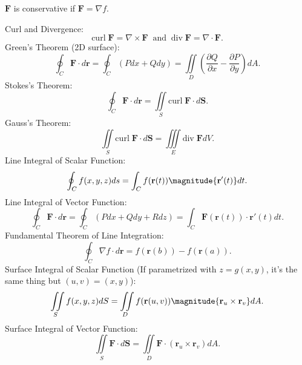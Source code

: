 \documentclass[11pt]{scrartcl}
\newcommand{\bvec}[1]{\mathbf{#1}}
\newcommand{\curl}{\mathrm{curl}\;}
\newcommand{\vdiv}{\mathrm{div}\;}
\begin{document}
    $\bvec{F}$ is conservative if $\bvec{F} = \nabla f$.

    Curl and Divergence:
    \[\curl\bvec{F} = \nabla \times \bvec{F} \;\; \text{and} \;\; \vdiv\bvec{F} = \nabla \cdot \bvec{F}.\]
    Green's Theorem (2D surface):
    \[\oint_{C}\bvec{F} \cdot d\bvec{r} = \oint_{C}(Pdx + Qdy) = \iint\limits_{D}\left(\frac{\partial Q}{\partial x} - \frac{\partial P}{\partial y}\right)dA.\]
    Stokes's Theorem:
    \[\oint_{C}\bvec{F} \cdot d\bvec{r} = \iint\limits_{S}\curl\bvec{F} \cdot d\bvec{S}.\]
    Gauss's Theorem:
    \[\iint\limits_{S}\curl\bvec{F} \cdot d\bvec{S} = \iiint\limits_{E}\vdiv\bvec{F}dV.\]
    Line Integral of Scalar Function:
    \[\oint_{C}f(x, y, z)ds = \int_{C}f(\bvec{r}(t))\magnitude{\bvec{r}'(t)}dt.\]
    Line Integral of Vector Function:
    \[\oint_{C}\bvec{F} \cdot d\bvec{r} = \oint_{C}(Pdx + Qdy + Rdz) = \int_{C}\bvec{F}(\bvec{r}(t)) \cdot \bvec{r}'(t)dt.\]
    Fundamental Theorem of Line Integration:
    \[\oint_{C}\nabla f \cdot d\bvec{r} = f(\bvec{r}(b)) - f(\bvec{r}(a)).\]
    Surface Integral of Scalar Function (If parametrized with $z = g(x, y)$, it's the same thing but $(u, v) = (x, y)$):
    \[\iint\limits_{S}f(x, y, z)dS = \iint\limits_{D}f(\bvec{r}(u, v))\magnitude{\bvec{r}_{u} \times \bvec{r}_{v}}dA.\]
    Surface Integral of Vector Function:
    \[\iint\limits_{S}\bvec{F} \cdot d\bvec{S} = \iint\limits_{D}\bvec{F} \cdot (\bvec{r}_{u} \times \bvec{r}_{v})dA.\]
\end{document}
